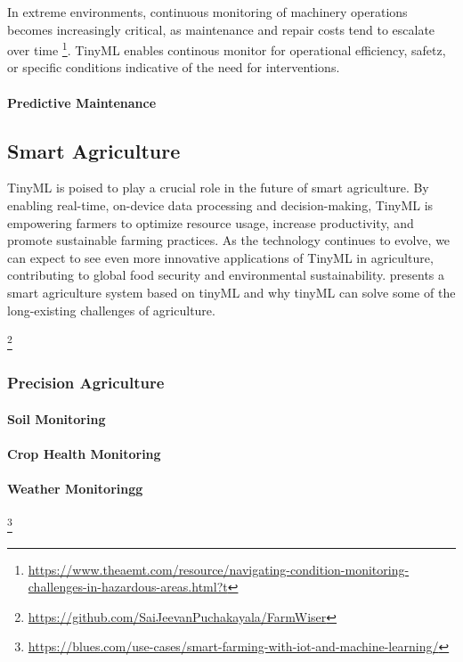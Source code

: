 \documentclass[twocolumn]{article}
\begin{document}
In extreme environments, continuous monitoring of machinery operations becomes increasingly critical, as maintenance and repair costs tend to escalate over time \footnote{\url{https://www.theaemt.com/resource/navigating-condition-monitoring-challenges-in-hazardous-areas.html?t}}. TinyML enables continous monitor for operational efficiency, safetz, or specific conditions indicative of the need for interventions.


\paragraph{Predictive Maintenance}



\subsection{Smart Agriculture}
TinyML is poised to play a crucial role in the future of smart agriculture. By enabling real-time, on-device data processing and decision-making, TinyML is empowering farmers to optimize resource usage, increase productivity, and promote sustainable farming practices. As the technology continues to evolve, we can expect to see even more innovative applications of TinyML in agriculture, contributing to global food security and environmental sustainability.
\cite{tsoukas_tinyml-based_2023} presents a smart agriculture system based on tinyML and why tinyML can solve some of the long-existing challenges of agriculture.

\footnote{\url{https://github.com/SaiJeevanPuchakayala/FarmWiser}}
\subsubsection{Precision Agriculture}

\paragraph{Soil Monitoring}
\paragraph{Crop Health Monitoring}
\paragraph{Weather Monitoringg}
\footnote{\url{https://blues.com/use-cases/smart-farming-with-iot-and-machine-learning/}}
\end{document}
